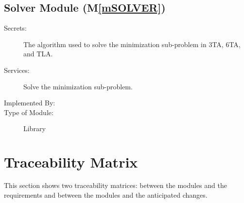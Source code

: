\documentclass[12pt, titlepage]{article}
\newcommand{\mref}[1]{M\ref{#1}}
\begin{document}
\subsection{Solver Module (\mref{mSOLVER})}

\begin{description}
\item[Secrets:] The algorithm used to solve the minimization sub-problem
    in 3TA, 6TA, and TLA.
\item[Services:] Solve the minimization sub-problem.
\item[Implemented By:] 
\item[Type of Module:] Library
\end{description}

\section{Traceability Matrix} \label{SecTM}

This section shows two traceability matrices: between the modules and the
requirements and between the modules and the anticipated changes.
\end{document}
